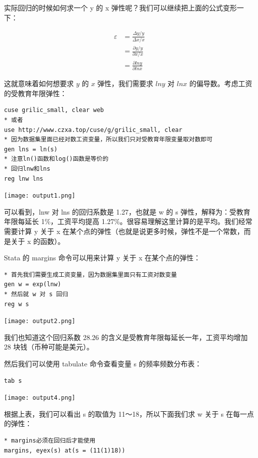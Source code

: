 \documentclass[cn,fancy,blue,11pt]{elegantbook}
\begin{document}
实际回归的时候如何求一个 y 的 x 弹性呢？我们可以继续把上面的公式变形一下：

\begin{align}
  \varepsilon & = \frac{\Delta y / y}{\Delta x / x} \\
  & = \frac{\partial y / y}{\partial x / x} \\
  & = \frac{\partial lny}{\partial lnx}
\end{align}

这就意味着如何想要求 \(y\) 的 \(x\) 弹性，我们需要求 \(lny\) 对 \(lnx\) 的偏导数。考虑工资的受教育年限弹性：

\begin{lstlisting}
cuse grilic_small, clear web
* 或者
use http://www.czxa.top/cuse/g/grilic_small, clear
* 因为数据集里面已经对数工资变量，所以我们只对受教育年限变量取对数即可
gen lns = ln(s)
* 注意ln()函数和log()函数是等价的
* 回归lnw和lns
reg lnw lns
\end{lstlisting}

\noindent\texttt{[image: output1.png]}

可以看到，lnw 对 lns 的回归系数是 1.27，也就是 w 的 s 弹性，解释为：受教育年限每延长 1\%，工资平均提高 1.27\%。很容易理解这里计算的是平均。我们经常需要计算 y 关于 x 在某个点的弹性（也就是说更多时候，弹性不是一个常数，而是关于 x 的函数）。

Stata 的 margins 命令可以用来计算 y 关于 x 在某个点的弹性：

\begin{lstlisting}
* 首先我们需要生成工资变量，因为数据集里面只有工资对数变量
gen w = exp(lnw)
* 然后就 w 对 s 回归
reg w s
\end{lstlisting}

\noindent\texttt{[image: output2.png]}

我们也知道这个回归系数 28.26 的含义是受教育年限每延长一年，工资平均增加 28 块钱（币种可能是美元）。

然后我们可以使用 tabulate 命令查看变量 s 的频率频数分布表：

\begin{lstlisting}
tab s
\end{lstlisting}

\noindent\texttt{[image: output4.png]}

根据上表，我们可以看出 s 的取值为 11～18，所以下面我们求 w 关于 s 在每一点的弹性：

\begin{lstlisting}
* margins必须在回归后才能使用
margins, eyex(s) at(s = (11(1)18))
\end{lstlisting}
\end{document}
